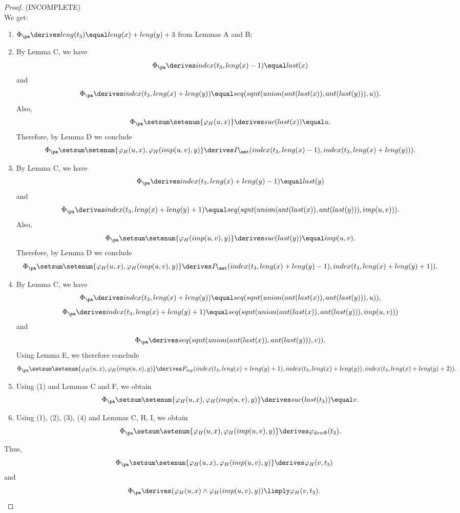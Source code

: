 \begin{proof} (INCOMPLETE)\\
We get:
\begin{enumerate}[(1)]
%
\item $\Phi_\pa \derives leng(t_3) \equal leng(x) + leng(y) + 3$ from Lemmas A and B;
%
\item By Lemma C, we have
\[
\Phi_\pa \derives index(t_3, leng(x) - 1) \equal last(x)
\]
and
\[
\Phi_\pa \derives index(t_3, leng(x) + leng(y)) \equal seq(sqnt(union(ant(last(x)), ant(last(y))), u)).
\]
Also,
\[
\Phi_\pa \setsum \setenum{\varphi_H(u, x)} \derives suc(last(x)) \equal u.
\]
Therefore, by Lemma D we conclude
\[
\Phi_\pa \setsum \setenum{\varphi_H(u, x), \varphi_H(imp(u, v), y)} \derives P_\ant(index(t_3, leng(x) - 1), index(t_3, leng(x) + leng(y))).
\]
%
\item By Lemma C, we have
\[
\Phi_\pa \derives index(t_3, leng(x) + leng(y) - 1) \equal last(y)
\]
and
\[
\Phi_\pa \derives index(t_3, leng(x) + leng(y) + 1) \equal seq(sqnt(union(ant(last(x)), ant(last(y))), imp(u, v))).
\]
Also,
\[
\Phi_\pa \setsum \setenum{\varphi_H(imp(u, v), y)} \derives suc(last(y)) \equal imp(u, v).
\]
Therefore, by Lemma D we conclude
\[
\Phi_\pa \setsum \setenum{\varphi_H(u, x), \varphi_H(imp(u, v), y)} \derives P_\ant(index(t_3, leng(x) + leng(y) - 1), index(t_3, leng(x) + leng(y) + 1)).
\]
%
\item By Lemma C, we have
\[
\Phi_\pa \derives index(t_3, leng(x) + leng(y)) \equal seq(sqnt(union(ant(last(x)), ant(last(y))), u)),
\]
\[
\Phi_\pa \derives index(t_3, leng(x) + leng(y) + 1) \equal seq(sqnt(union(ant(last(x)), ant(last(y))), imp(u, v)))
\]
and
\[
\Phi_\pa \derives seq(sqnt(union(ant(last(x)), ant(last(y))), v)).
\]
Using Lemma E, we therefore conclude
\[
\Phi_\pa \setsum \setenum{\varphi_H(u, x), \varphi_H(imp(u, v), y)} \derives P_{mp}(index(t_3, leng(x) + leng(y) + 1), index(t_3, leng(x) + leng(y)), index(t_3, leng(x) + leng(y) + 2)).
\]
%
\item Using (1) and Lemmas C and F, we obtain
\[
\Phi_\pa \setsum \setenum{\varphi_H(u, x), \varphi_H(imp(u, v), y)} \derives suc(last(t_3)) \equal v.
\]
%
\item Using (1), (2), (3), (4) and Lemmas C, H, I, we obtain
\[
\Phi_\pa \setsum \setenum{\varphi_H(u, x), \varphi_H(imp(u, v), y)} \derives \varphi_{dvn\Phi}(t_3).
\]
%
\end{enumerate}
Thus,
\[
\Phi_\pa \setsum \setenum{\varphi_H(u, x), \varphi_H(imp(u, v), y)} \derives \varphi_H(v, t_3)
\]
and
\[
\Phi_\pa \derives (\varphi_H(u, x) \land \varphi_H(imp(u, v), y)) \limply \varphi_H(v, t_3). \qedhere
\]
\end{proof}
